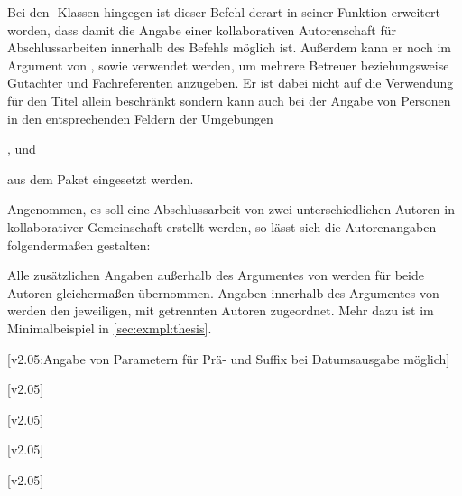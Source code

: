 \begin{DeclareEntity*}{}
\begin{DeclareEntity*}{}
\begin{DeclareEntity*}{}
\begin{Declaration}
Bei den \TUDScript-Klassen hingegen ist dieser Befehl derart in seiner Funktion 
erweitert worden, dass damit die Angabe einer kollaborativen Autorenschaft für 
Abschlussarbeiten innerhalb des Befehls  möglich ist. Außerdem 
kann er noch im Argument von ,  sowie 
 verwendet werden, um mehrere Betreuer beziehungsweise Gutachter 
und Fachreferenten anzugeben. Er ist dabei nicht auf die Verwendung für den 
Titel allein beschränkt sondern kann auch bei der Angabe von Personen in den 
entsprechenden Feldern der Umgebungen
\begin{Entity}{}
,  und 
\end{Entity}
aus dem Paket  eingesetzt werden.
\end{Declaration}
%
\begin{Example}
Angenommen, es soll eine Abschlussarbeit von zwei unterschiedlichen Autoren in 
kollaborativer Gemeinschaft erstellt werden, so lässt sich die Autorenangaben 
folgendermaßen gestalten:
\begin{Code}
\author{%
  Mickey Mouse%
\and%
  Donald Duck%
}
\end{Code}
Alle zusätzlichen Angaben außerhalb des Argumentes von  werden 
für beide Autoren gleichermaßen übernommen. Angaben innerhalb des Argumentes 
von  werden den jeweiligen, mit  getrennten Autoren 
zugeordnet. Mehr dazu ist im Minimalbeispiel in \autoref{sec:exmpl:thesis}.
\end{Example}

\begin{Declaration}
  {}
  [v2.05:Angabe von Parametern für Prä- und Suffix bei Datumsausgabe möglich]
\begin{Declaration}
  {}
  [v2.05]
\begin{Declaration}
  {}
  [v2.05]
\begin{Declaration}
  {}
  [v2.05]
\begin{Declaration}
  {}
  [v2.05]
\begin{Declaration}
  {}


\end{Declaration}
\end{Declaration}
\end{Declaration}
\end{Declaration}
\end{Declaration}
\end{Declaration}
\end{DeclareEntity*}
\end{DeclareEntity*}
\end{DeclareEntity*}
